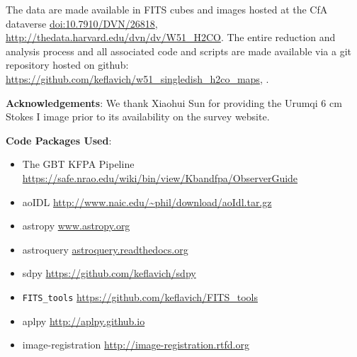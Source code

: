The data are made available in FITS cubes and images hosted at the CfA
dataverse \url{doi:10.7910/DVN/26818},
\url{http://thedata.harvard.edu/dvn/dv/W51_H2CO}.
The entire reduction and analysis process and all associated code and scripts
are made available via a git
repository hosted on github:
\url{https://github.com/keflavich/w51_singledish_h2co_maps}, .



 
% 
% 

\textbf{Acknowledgements}:
We thank Xiaohui Sun for providing the Urumqi 6 cm Stokes I image prior to its
availability on the survey website.

\textbf{Code Packages Used}:

\begin{itemize}
    \item The GBT KFPA Pipeline \url{https://safe.nrao.edu/wiki/bin/view/Kbandfpa/ObserverGuide}
    \item aoIDL \url{http://www.naic.edu/~phil/download/aoIdl.tar.gz}
    \item astropy \url{www.astropy.org}
    \item astroquery \url{astroquery.readthedocs.org}
    \item sdpy \url{https://github.com/keflavich/sdpy}
    \item \texttt{FITS\_tools} \url{https://github.com/keflavich/FITS_tools}
    \item aplpy \url{http://aplpy.github.io}
    \item image-registration \url{http://image-registration.rtfd.org}
\end{itemize}

